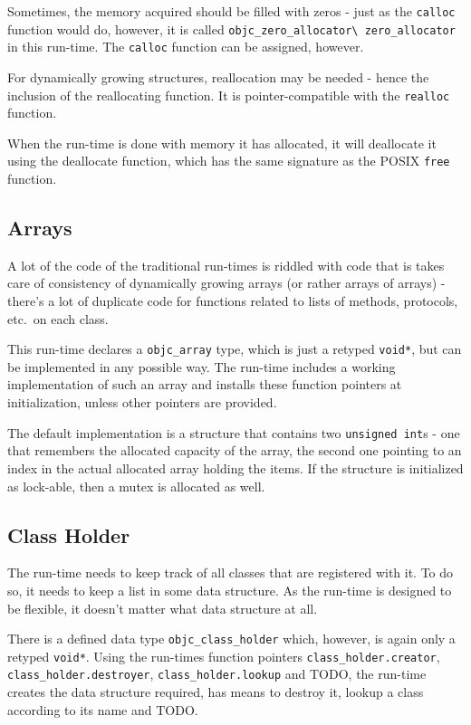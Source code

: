 Sometimes, the memory acquired should be filled with zeros - just as the \verb=calloc= function would do, however, it is called \verb=objc_zero_allocator\ zero_allocator= in this run-time. The \verb=calloc= function can be assigned, however.

For dynamically growing structures, reallocation may be needed - hence the inclusion of the reallocating function. It is pointer-compatible with the \verb=realloc= function.

When the run-time is done with memory it has allocated, it will deallocate it using the deallocate function, which has the same signature as the POSIX \verb=free= function.

\subsection{Arrays}

A lot of the code of the traditional run-times is riddled with code that is takes care of consistency of dynamically growing arrays (or rather arrays of arrays) - there's a lot of duplicate code for functions related to lists of methods, protocols, etc.\ on each class.

This run-time declares a \verb=objc_array= type, which is just a retyped \verb=void*=, but can be implemented in any possible way. The run-time includes a working implementation of such an array and installs these function pointers at initialization, unless other pointers are provided.

The default implementation is a structure that contains two \verb=unsigned int=s - one that remembers the allocated capacity of the array, the second one pointing to an index in the actual allocated array holding the items. If the structure is initialized as lock-able, then a mutex is allocated as well.


\subsection{Class Holder}

The run-time needs to keep track of all classes that are registered with it. To do so, it needs to keep a list in some data structure. As the run-time is designed to be flexible, it doesn't matter what data structure at all.

There is a defined data type \verb=objc_class_holder= which, however, is again only a retyped \verb=void*=. Using the run-times function pointers \verb=class_holder.creator=, \verb=class_holder.destroyer=, \verb=class_holder.lookup= and TODO, the run-time creates the data structure required, has means to destroy it, lookup a class according to its name and TODO.

